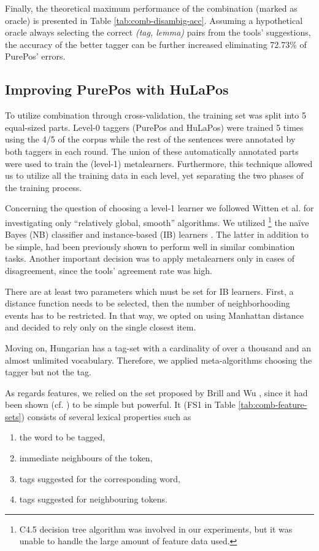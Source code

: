 Finally, the theoretical maximum performance of the combination (marked as oracle) is presented in Table \ref{tab:comb-disambig-acc}.
Assuming a hypothetical oracle always selecting the correct \emph{(tag, lemma)} pairs from the tools' suggestions, the accuracy of the better tagger can be further increased eliminating 72.73\% of PurePos' errors. 

\subsection{Improving PurePos with HuLaPos}

To utilize combination through cross-validation, the training set was split into 5 equal-sized parts.
Level-0 taggers (PurePos and HuLaPos) were trained 5 times using the 4/5 of the corpus while the rest of the sentences were annotated by both taggers in each round.
The union of these automatically annotated parts were used to train the (level-1) metalearners.
Furthermore, this technique allowed us to utilize all the training data in each level, yet separating the two phases of the training process. 

Concerning the question of choosing a level-1 learner we followed Witten et al. \cite{Witten2011} for investigating only ``relatively global, smooth'' algorithms.
We utilized \footnote{C4.5 decision tree algorithm was involved in our experiments, but it was unable to handle the large amount of feature data used.} the naïve Bayes (NB) classifier \cite{John1995} and instance-based (IB) learners \cite{Aha1991}.
The latter in addition to be simple, had been previously shown to perform well in similar combination tasks.
Another important decision was to apply metalearners only in cases of disagreement, since the tools’ agreement rate was high.

There are at least two parameters which must be set for IB learners.
First, a distance function needs to be selected, then the number of neighborhooding events has to be restricted.
In that way, we opted on using Manhattan distance and decided to rely only on the single closest item. 

Moving on, Hungarian has a tag-set with a cardinality of over a thousand and an almost unlimited vocabulary.
Therefore, we applied meta-algorithms choosing the tagger but not the tag. 

As regards features, we relied on the set proposed by Brill and Wu \cite{Brill1998}, since it had been shown (cf. \cite{Halteren2001}) to be simple but powerful. It (FS1 in Table \ref{tab:comb-feature-sets}) consists of several lexical properties such as
\begin{enumerate}
 \item the word to be tagged, 
 \item immediate neighbours of the token,
 \item tags suggested for the corresponding word,
 \item tags suggested for neighbouring tokens.
\end{enumerate}

